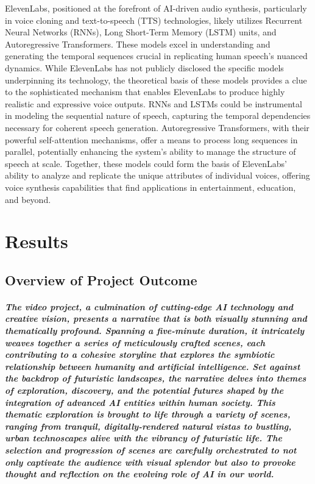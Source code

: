 \documentclass[11pt,a4paper,oneside]{report}
\begin{document}
ElevenLabs, positioned at the forefront of AI-driven audio synthesis, particularly in voice cloning and text-to-speech (TTS) technologies, likely utilizes Recurrent Neural Networks (RNNs), Long Short-Term Memory (LSTM) units, and Autoregressive Transformers. 
These models excel in understanding and generating the temporal sequences crucial in replicating human speech's nuanced dynamics. 
While ElevenLabs has not publicly disclosed the specific models underpinning its technology, the theoretical basis of these models provides a clue to the sophisticated mechanism that enables ElevenLabs to produce highly realistic and expressive voice outputs. 
RNNs and LSTMs could be instrumental in modeling the sequential nature of speech, capturing the temporal dependencies necessary for coherent speech generation. 
Autoregressive Transformers, with their powerful self-attention mechanisms, offer a means to process long sequences in parallel, potentially enhancing the system's ability to manage the structure of speech at scale. 
Together, these models could form the basis of ElevenLabs’ ability to analyze and replicate the unique attributes of individual voices, offering voice synthesis capabilities that find applications in entertainment, education, and beyond.


\chapter{Results}
\label{results}
\section{Overview of Project Outcome}

\paragraph{The video project, a culmination of cutting-edge AI technology and creative vision, presents a narrative that is both visually stunning and thematically profound. Spanning a five-minute duration, it intricately weaves together a series of meticulously crafted scenes, each contributing to a cohesive storyline that explores the symbiotic relationship between humanity and artificial intelligence. Set against the backdrop of futuristic landscapes, the narrative delves into themes of exploration, discovery, and the potential futures shaped by the integration of advanced AI entities within human society. This thematic exploration is brought to life through a variety of scenes, ranging from tranquil, digitally-rendered natural vistas to bustling, urban technoscapes alive with the vibrancy of futuristic life. The selection and progression of scenes are carefully orchestrated to not only captivate the audience with visual splendor but also to provoke thought and reflection on the evolving role of AI in our world.}
\end{document}
